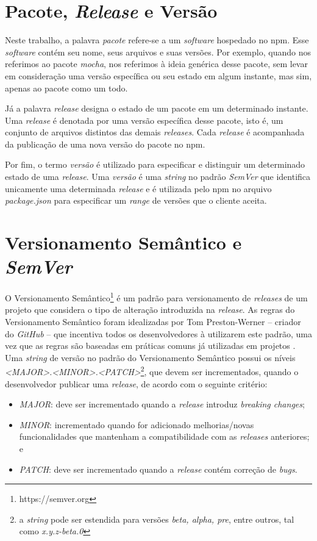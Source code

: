 \section{Pacote, \textit{Release} e Versão}
\label{ref-teo:pac_rel_ver}
Neste trabalho, a palavra \textit{pacote} refere-se a um \textit{software} hospedado no \gls{npm}. Esse \textit{software} contém seu nome, seus arquivos e suas versões. Por exemplo, quando nos referimos ao pacote \textit{mocha}, nos referimos à ideia genérica desse pacote, sem levar em consideração uma versão específica ou seu estado em algum instante, mas sim, apenas ao pacote como um todo.

Já a palavra \textit{release} designa o estado de um pacote em um determinado instante. Uma \textit{release} é denotada por uma versão específica desse pacote, isto é, um conjunto de arquivos distintos das demais \textit{releases}. Cada \textit{release} é acompanhada da publicação de uma nova versão do pacote no \gls{npm}.

Por fim, o termo \textit{versão} é utilizado para especificar e distinguir um determinado estado de uma \textit{release}. Uma \textit{versão} é uma \textit{string} no padrão \textit{SemVer} que identifica unicamente uma determinada \textit{release} e é utilizada pelo \gls{npm} no arquivo \textit{package.json} para especificar um \textit{range} de versões que o cliente aceita.

\section{Versionamento Semântico e \textit{SemVer}}
\label{ref-teo:semver}
O Versionamento Semântico\footnote{https://semver.org} é um padrão para versionamento de \textit{releases} de um projeto que considera o tipo de alteração introduzida na \textit{release}. As regras do Versionamento Semântico foram idealizadas por Tom Preston-Werner -- criador do \textit{GitHub} -- que incentiva todos os desenvolvedores à utilizarem este padrão, uma vez que as regras são baseadas em práticas comuns já utilizadas em projetos \cite{teorical_reference:semver}. Uma \textit{string} de versão no padrão do Versionamento Semântico possui os níveis \textit{<MAJOR>.<MINOR>.<PATCH>}\footnote{a \textit{string} pode ser estendida para versões \textit{beta, alpha, pre}, entre outros, tal como \textit{x.y.z-beta.0}}, que devem ser incrementados, quando o desenvolvedor publicar uma \textit{release}, de acordo com o seguinte critério:

\begin{itemize}
    \item \textit{MAJOR}: deve ser incrementado quando a \textit{release} introduz \textit{breaking changes};
    \item \textit{MINOR}: incrementado quando for adicionado melhorias/novas funcionalidades que mantenham a compatibilidade com as \textit{releases} anteriores; e
    \item \textit{PATCH}: deve ser incrementado quando a \textit{release} contém correção de \textit{bugs}.
\end{itemize}{}

